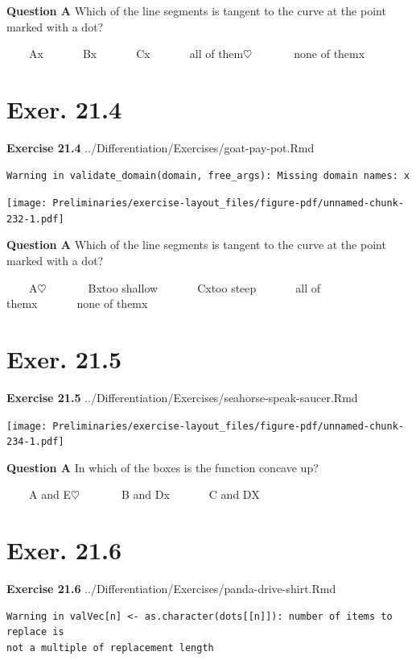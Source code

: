\documentclass[
  letterpaper,
  DIV=11,
  numbers=noendperiod,
  oneside]{article}
\begin{document}
\begin{multicols}{2}
\textbf{Question A} Which of the line segments is tangent to the curve
at the point marked with a dot?

~~~~{A{x}}~~~~~~~{B{x}}~~~~~~~{C{x}}~~~~~~~{all of
them{\(\heartsuit\ \)}}~~~~~~~{none of them{x}}

\hypertarget{exer.-21.4}{%
\section*{Exer. 21.4}\label{exer.-21.4}}

\textbf{Exercise 21.4} ../Differentiation/Exercises/goat-pay-pot.Rmd

\begin{verbatim}
Warning in validate_domain(domain, free_args): Missing domain names: x
\end{verbatim}

\texttt{[image: Preliminaries/exercise-layout\_files/figure-pdf/unnamed-chunk-232-1.pdf]}

\textbf{Question A} Which of the line segments is tangent to the curve
at the point marked with a dot?

~~~~{A{\(\heartsuit\ \)}}~~~~~~~{B{xtoo shallow}}~~~~~~~{C{xtoo
steep}}~~~~~~~{all of them{x}}~~~~~~~{none of them{x}}

\hypertarget{exer.-21.5}{%
\section*{Exer. 21.5}\label{exer.-21.5}}

\textbf{Exercise 21.5}
../Differentiation/Exercises/seahorse-speak-saucer.Rmd

\texttt{[image: Preliminaries/exercise-layout\_files/figure-pdf/unnamed-chunk-234-1.pdf]}

\textbf{Question A} In which of the boxes is the function concave up?

~~~~{A and E{\(\heartsuit\ \)}}~~~~~~~{B and D{x}}~~~~~~~{C and D{︎X
}}

\hypertarget{exer.-21.6}{%
\section*{Exer. 21.6}\label{exer.-21.6}}

\textbf{Exercise 21.6}
../Differentiation/Exercises/panda-drive-shirt.Rmd

\begin{verbatim}
Warning in valVec[n] <- as.character(dots[[n]]): number of items to replace is
not a multiple of replacement length


\end{verbatim}
\end{multicols}
\end{document}
